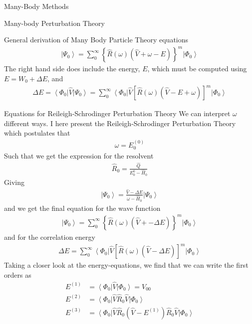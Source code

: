 \documentclass[twoside,english]{uiofysmaster}
\begin{document}
\begin{chapter}{Many-Body Methods}
\begin{section}{Many-body Perturbation Theory}
\begin{subsection}{General derivation of Many Body Particle Theory equations}
	 		\begin{align}
	 			\left| \Psi_0 \right> = \sum_0^\infty \left\{ \hat R(\omega) (\hat V + \omega - E) \right\}^m \left| \Phi_0 \right>
	 		\end{align}
	 		The right hand side does include the energy, $E$, which must be computed using $ E = W_0 + \Delta E$, and
	 		\begin{align}
	 			\Delta E = \left< \Phi_0 \right| \hat V \left| \Psi_0 \right> 
	 			= \sum_0^\infty \left< \Phi_0 \right| \hat V \left[ \hat R(\omega) (\hat V - E + \omega) \right]^m \left| \Phi_0 \right>  
	 		\end{align}
	 	\end{subsection}

	 	\begin{subsection}{Equations for Reileigh-Schrodinger Perturbation Theory}
	 		We can interpret $\omega$ different ways. I here present the Reileigh-Schrodinger Perturbation Theory which postulates that
	 		\begin{align}
	 			\omega = E_0^{(0)}
	 		\end{align}
	 		Such that we get the expression for the resolvent
	 		\begin{align}
	 			\hat R_0 = \frac{\hat Q}{E_0^{0} - \hat H_0}
	 		\end{align}
	 		Giving
	 		\begin{align}
	 			\left| \Psi_0 \right> = \frac{ \hat V - \Delta E }{\omega - \hat H_0} \left| \Psi_0 \right>
	 		\end{align}
	 		and we get the final equation for the wave function 
	 		\begin{align}
	 			\left| \Psi_0 \right> = \sum_0^\infty \left\{ \hat R(\omega) (\hat V + - \Delta E) \right\}^m \left| \Phi_0 \right>
	 		\end{align}
	 		and for the correlation energy
	 		\begin{align}
	 			\Delta E = \sum_0^\infty \left< \Phi_0 \right| \hat V \left[ \hat R(\omega) (\hat V - \Delta E) \right]^m \left| \Phi_0 \right>  
	 		\end{align}
	 		Taking a closer look at the energy-equations, we find that we can write the first orders as
	 		\begin{align*}
	 			E^{(1)} &= \left< \Phi_0 \right| \hat V \left| \Phi_0 \right>  = V_{00}\\
	 			E^{(2)} &= \left< \Phi_0 \right| \hat V \hat R_0 \hat V \left| \Phi_0 \right> \\
	 			E^{(3)} &= \left< \Phi_0 \right| \hat V \hat R_0 (\hat V - E^{(1)})  \hat R_0 \hat V \left| \Phi_0 \right> \\

\end{align*}
\end{subsection}
\end{section}
\end{chapter}
\end{document}
